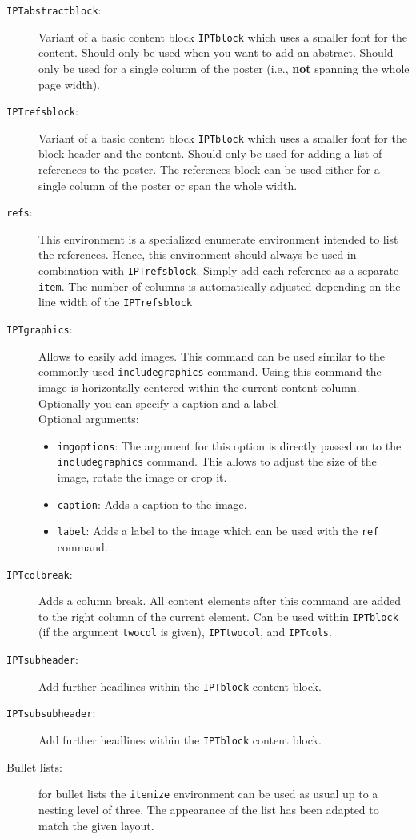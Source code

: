 \begin{description}
	\item[\texttt{IPTabstractblock}:] Variant of a basic content block \texttt{IPTblock} which uses a smaller font for the content. Should only be used when you want to add an abstract. Should only be used for a single column of the poster (i.e., \textbf{not} spanning the whole page width).

	\item[\texttt{IPTrefsblock}:] Variant of a basic content block \texttt{IPTblock} which uses a smaller font for the block header and the content. Should only be used for adding a list of references to the poster. The references block can be used either for a single column of the poster or span the whole width.

	\item[\texttt{refs}:] This environment is a specialized enumerate environment intended to list the references. Hence, this environment should always be used in combination with \texttt{IPTrefsblock}. Simply add each reference as a separate \texttt{\bs{}item}. The number of columns is automatically adjusted depending on the line width of the \texttt{\bs{}IPTrefsblock}\\

	\item[\texttt{\bs{}IPTgraphics}:] Allows to easily add images. This command can be used similar to the commonly used \texttt{includegraphics} command. Using this command the image is horizontally centered within the current content column. Optionally you can specify a caption and a label.\\
	Optional arguments:
	\begin{itemize}
		\item \texttt{imgoptions}: The argument for this option is directly passed on to the \texttt{includegraphics} command. This allows to adjust the size of the image, rotate the image or crop it.
		\item \texttt{caption}: Adds a caption to the image.
		\item \texttt{label}: Adds a label to the image which can be used with the \texttt{ref} command.
	\end{itemize}


	\item[\texttt{\bs{}IPTcolbreak}:] Adds a column break. All content elements after this command are added to the right column of the current element. Can be used within \texttt{IPTblock} (if the argument \texttt{twocol} is given), \texttt{IPTtwocol}, and \texttt{IPTcols}.

	\item[\texttt{\bs{}IPTsubheader}:] Add further headlines within the \texttt{\bs{}IPTblock} content block.

	\item[\texttt{\bs{}IPTsubsubheader}:] Add further headlines within the \texttt{\bs{}IPTblock} content block.

	\item[Bullet lists:] for bullet lists the \texttt{itemize} environment can be used as usual up to a nesting level of three. The appearance of the list has been adapted to match the given layout.
\end{description}

